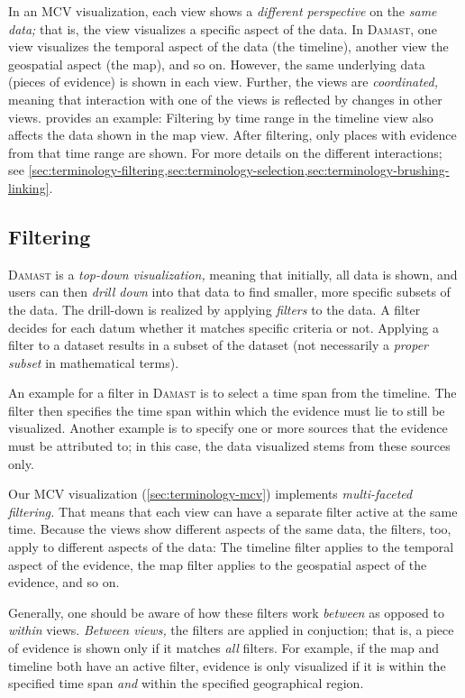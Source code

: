 In an MCV visualization, each view shows a \emph{different perspective} on the \emph{same data;}
that is, the view visualizes a specific aspect of the data.
In \textsc{Damast}, one view visualizes the temporal aspect of the data (the timeline), another view the geospatial aspect (the map), and so on.
However, the same underlying data (pieces of evidence) is shown in each view.
Further, the views are \emph{coordinated,} meaning that interaction with one of the views is reflected by changes in other views.
 provides an example:
Filtering by time range in the timeline view also affects the data shown in the map view.
After filtering, only places with evidence from that time range are shown.
For more details on the different interactions; see \cref{sec:terminology-filtering,sec:terminology-selection,sec:terminology-brushing-linking}.


\subsection{Filtering}
\label{sec:terminology-filtering}

\textsc{Damast} is a \emph{top-down visualization,} meaning that initially, all data is shown, and users can then \emph{drill down} into that data to find smaller, more specific subsets of the data.
The drill-down is realized by applying \emph{filters} to the data.
A filter decides for each datum whether it matches specific criteria or not.
Applying a filter to a dataset results in a subset of the dataset (not necessarily a \emph{proper subset} in mathematical terms).

An example for a filter in \textsc{Damast} is to select a time span from the timeline.
The filter then specifies the time span within which the evidence must lie to still be visualized.
Another example is to specify one or more sources that the evidence must be attributed to;
in this case, the data visualized stems from these sources only.

Our MCV visualization (\cref{sec:terminology-mcv}) implements \emph{multi-faceted filtering.}
That means that each view can have a separate filter active at the same time.
Because the views show different aspects of the same data, the filters, too, apply to different aspects of the data:
The timeline filter applies to the temporal aspect of the evidence, the map filter applies to the geospatial aspect of the evidence, and so on.

Generally, one should be aware of how these filters work \emph{between} as opposed to \emph{within} views.
\emph{Between views,} the filters are applied in conjuction;
that is, a piece of evidence is shown only if it matches \emph{all} filters.
For example, if the map and timeline both have an active filter, evidence is only visualized if it is within the specified time span \emph{and} within the specified geographical region.

